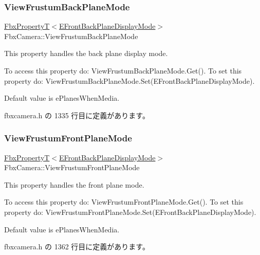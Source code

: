 \subsubsection{\texorpdfstring{View\+Frustum\+Back\+Plane\+Mode}{ViewFrustumBackPlaneMode}}
{\footnotesize\ttfamily \hyperlink{class_fbx_property_t}{Fbx\+PropertyT}$<$\hyperlink{class_fbx_camera_ab7b9d3e546552049a79261a444f9b44a}{E\+Front\+Back\+Plane\+Display\+Mode}$>$ Fbx\+Camera\+::\+View\+Frustum\+Back\+Plane\+Mode}

This property handles the back plane display mode.

To access this property do\+: View\+Frustum\+Back\+Plane\+Mode.\+Get(). To set this property do\+: View\+Frustum\+Back\+Plane\+Mode.\+Set(\+E\+Front\+Back\+Plane\+Display\+Mode).

Default value is e\+Planes\+When\+Media. 

 fbxcamera.\+h の 1335 行目に定義があります。

\mbox{\label{class_fbx_camera_a7d91e0645351854d02925da94d4cb924}} 
\subsubsection{\texorpdfstring{View\+Frustum\+Front\+Plane\+Mode}{ViewFrustumFrontPlaneMode}}
{\footnotesize\ttfamily \hyperlink{class_fbx_property_t}{Fbx\+PropertyT}$<$\hyperlink{class_fbx_camera_ab7b9d3e546552049a79261a444f9b44a}{E\+Front\+Back\+Plane\+Display\+Mode}$>$ Fbx\+Camera\+::\+View\+Frustum\+Front\+Plane\+Mode}

This property handles the front plane mode.

To access this property do\+: View\+Frustum\+Front\+Plane\+Mode.\+Get(). To set this property do\+: View\+Frustum\+Front\+Plane\+Mode.\+Set(\+E\+Front\+Back\+Plane\+Display\+Mode).

Default value is e\+Planes\+When\+Media. 

 fbxcamera.\+h の 1362 行目に定義があります。

\mbox{\label{class_fbx_camera_aaf010c106bab5fca32acadc0b97d8437}} 
